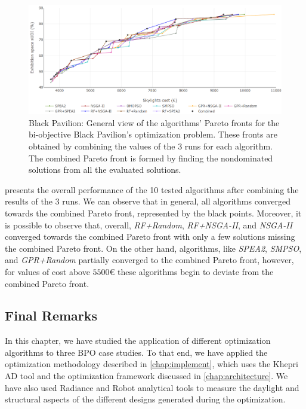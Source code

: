\begin{figure}[htbp]
	\centering
	\includegraphics[width=\textwidth]{Images/Evaluation/BlackPavilion/All_Algorithms_all_runs-2019-04-16.png}
	\caption[Black Pavilion: General view of the Pareto fronts retrieved by 10 algorithms]{Black Pavilion: General view of the algorithms' Pareto fronts for the bi-objective Black Pavilion's optimization problem. These fronts are obtained by combining the values of the 3 runs for each algorithm. The combined Pareto front is formed by finding the nondominated solutions from all the evaluated solutions.}
	\label{fig:blackpavilionallruns}
\end{figure}

 presents the overall performance of the 10 tested algorithms after combining the results of the 3 runs. We can observe that in general, all algorithms converged towards the combined Pareto front, represented by the black points. Moreover, it is possible to observe that, overall, \textit{RF+Random}, \textit{RF+NSGA-II}, and \textit{\ac{NSGA-II}} converged towards the combined Pareto front with only a few solutions missing the combined Pareto front. On the other hand, algorithms, like \textit{\ac{SPEA2}}, \textit{SMPSO}, and \textit{GPR+Random} partially converged to the combined Pareto front, however, for values of cost above $5500$€ these algorithms begin to deviate from the combined Pareto front.

\subsection{Final Remarks}

In this chapter, we have studied the application of different optimization algorithms to three \ac{BPO} case studies. To that end, we have applied the optimization methodology described in \cref{chap:implement}, which uses the Khepri \ac{AD} tool and the optimization framework discussed in \cref{chap:architecture}. We have also used Radiance and Robot analytical tools to measure the daylight and structural aspects of the different designs generated during the optimization.

